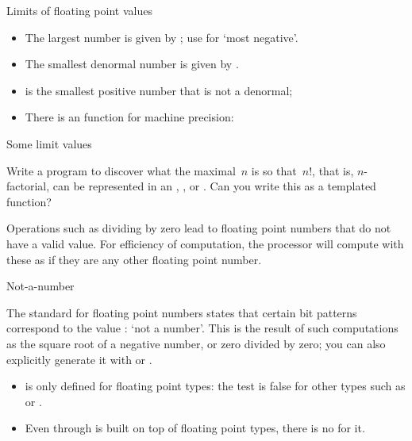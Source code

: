 \begin{block}{Limits of floating point values}
  \label{sl:float-limits}
  \begin{itemize}
  \item The largest number is given by ;
    use  for `most negative'.
  \item The smallest denormal number is given by .
  \item {} is the smallest positive number
    that is not a denormal;
  \item There is an  function for machine precision:
  \end{itemize}
\end{block}

\begin{block}{Some limit values}
  \label{sl:ieee-limits}
    \def\codesize{\ttfamily\scriptsize}
\end{block}

\begin{exercise}
  \label{ex:big-factorial}
  Write a program to discover what the maximal~$n$ is so that~$n!$,
  that is, $n$-factorial, can be represented in an , ,
  or . Can you write this as a templated function?
\end{exercise}

Operations such as dividing by zero lead to floating point numbers
that do not have a valid value. For efficiency of computation, the
processor will compute with these as if they are any other floating
point number.

 {Not-a-number}
\label{sec:naninf}

The  standard for floating point numbers
states that certain bit patterns correspond to the value
: `not a number'.
This is the result of such computations as the square root
of a negative number, or zero divided by zero;
you can also explicitly generate it
with  or .

\begin{itemize}
\item {} is only defined for floating point types:
  the test  is false for other types
  such as  or .
\item Even through  is built on top of
  floating point types, there is no  for it.
\end{itemize}

